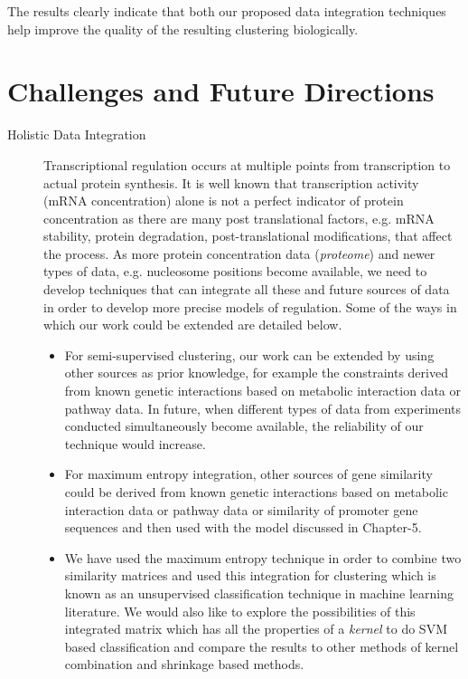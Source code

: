 The results clearly indicate that both our proposed data integration techniques help improve the quality of the resulting clustering biologically.
\section{Challenges and Future Directions}
\begin{description}
\item[Holistic Data Integration] Transcriptional regulation occurs at multiple points from transcription to actual protein synthesis. It is well known that transcription activity (\ac{mRNA} concentration) alone is not a perfect indicator of protein concentration \citep{Griffin02Complementary} as there are many post translational factors, e.g. \ac{mRNA} stability, protein degradation, post-translational modifications, that affect the process. As more protein concentration data (\textit{proteome}) and newer types of data, e.g. nucleosome positions \citep{segal2007genomiccode,field2008distinct,kaplan2008nucleosome} become available, we need to develop techniques that can integrate all these and future sources of data in order to develop more precise models of regulation. Some of the ways in which our work could be extended are detailed below.
\begin{itemize}
    \item For semi-supervised clustering, our work can be extended by using other sources as prior knowledge, for example the constraints derived from known genetic interactions based on metabolic interaction data or pathway data. In future, when different types of data from experiments conducted simultaneously become available, the reliability of our technique would increase.

    \item For maximum entropy integration, other sources of gene similarity could be derived from known genetic interactions based on metabolic interaction data or pathway data or similarity of promoter gene sequences \citep{jean2006kernels} and then used with the model discussed in Chapter-5.

    \item We have used the maximum entropy technique in order to combine two similarity matrices and used this integration for clustering which is known as an unsupervised classification technique in machine learning literature. We would also like to explore the possibilities of this integrated matrix which has all the properties of a \textit{kernel} to do SVM based classification and compare the results to other methods of kernel combination \citep{lanck04kerneldatafusion} and shrinkage based methods.


\end{itemize}
\end{description}
